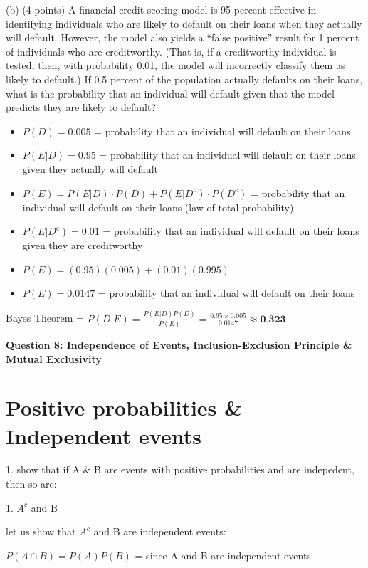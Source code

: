 \documentclass{article}
\begin{document}
(b) (4 points) A financial credit scoring model is 95 percent effective in identifying individuals who
are likely to default on their loans when they actually will default. However, the model also yields a
“false positive” result for 1 percent of individuals who are creditworthy. (That is, if a creditworthy
individual is tested, then, with probability 0.01, the model will incorrectly classify them as likely
to default.) If 0.5 percent of the population actually defaults on their loans, what is the probability
that an individual will default given that the model predicts they are likely to default?

\begin{itemize}
    \item \(P(D) = 0.005\) = probability that an individual will default on their loans
    \item \(P(E|D) = 0.95\) = probability that an individual will default on their loans given they actually will default
    \item \(P(E) = P(E|D) \cdot P(D) + P(E|D^c) \cdot P(D^c)\) = probability that an individual will default on their loans (law of total probability)
    \item \(P(E|D^c) = 0.01\) = probability that an individual will default on their loans given they are creditworthy
    \item \(P(E) = (0.95)(0.005) + (0.01)(0.995)\)
    \item \(P(E) = 0.0147\) = probability that an individual will default on their loans
\end{itemize}

Bayes Theorem = \(P(D|E) = \frac{P(E|D)P(D)}{P(E)} = \frac{0.95 \times 0.005}{0.0147} \approx \textbf{0.323}\)

\begin{center}
    \large \textbf{Question 8: Independence of Events, Inclusion-Exclusion Principle \& Mutual Exclusivity}
\end{center}

\section{Positive probabilities \& Independent events}
1. show that if A \& B are events with positive probabilities and are indepedent, then so are:

1. \(A^c\) and B 

let us show that \(A^c\) and B are independent events:

\(P(A \cap B) = P(A)P(B)\) = since A and B are independent events
\end{document}
